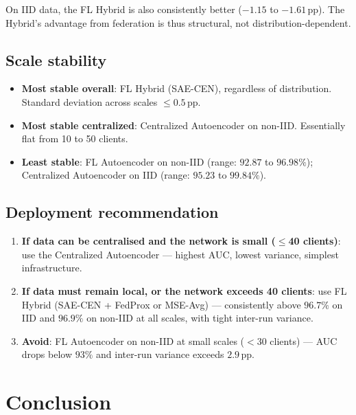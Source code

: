 \documentclass[11pt,a4paper]{article}
\begin{document}
On IID data, the FL Hybrid is also consistently better ($-1.15$ to $-1.61$\,pp).
The Hybrid's advantage from federation is thus structural, not distribution-dependent.

\subsection{Scale stability}

\begin{itemize}[leftmargin=1.8em]
  \item \textbf{Most stable overall}: FL Hybrid (SAE-CEN), regardless of
        distribution. Standard deviation across scales $\leq 0.5$\,pp.
  \item \textbf{Most stable centralized}: Centralized Autoencoder on non-IID.
        Essentially flat from 10 to 50 clients.
  \item \textbf{Least stable}: FL Autoencoder on non-IID (range: $92.87$ to $96.98\%$);
        Centralized Autoencoder on IID (range: $95.23$ to $99.84\%$).
\end{itemize}

\subsection{Deployment recommendation}

\begin{enumerate}[leftmargin=1.8em]
  \item \textbf{If data can be centralised and the network is small ($\leq$40 clients)}:
        use the Centralized Autoencoder — highest AUC, lowest variance, simplest
        infrastructure.
  \item \textbf{If data must remain local, or the network exceeds 40 clients}:
        use FL Hybrid (SAE-CEN + FedProx or MSE-Avg) — consistently above $96.7\%$
        on IID and $96.9\%$ on non-IID at all scales, with tight inter-run variance.
  \item \textbf{Avoid}: FL Autoencoder on non-IID at small scales ($<$30 clients)
        — AUC drops below $93\%$ and inter-run variance exceeds $2.9$\,pp.
\end{enumerate}

\newpage
\section{Conclusion}
\end{document}
